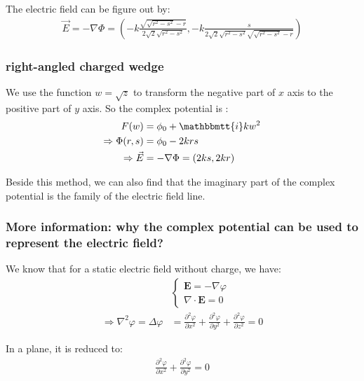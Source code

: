 \documentclass[]{ctexart}
\newcommand{\mi}{\mathbbmtt{i}}
\newcommand{\pa}{\partial}
\begin{document}
				The electric field can be figure out by:
					\begin{equation*}
					\begin{aligned}
						\vec{E}=-\nabla \Phi =\left(-k\frac{\sqrt{\sqrt{r^2-s^2}-r}}{2 \sqrt{2} \sqrt{r^2-s^2}},-k\frac{s}{2 \sqrt{2} \sqrt{r^2-s^2} \sqrt{\sqrt{r^2-s^2}-r}}\right)
					\end{aligned}
					\end{equation*}
			
			\subsubsection{right-angled charged wedge}
				We use the function $w=\sqrt{z}$ to transform the negative part of $x$ axis to the positive part of $y$ axis. So the complex potential is :
					\begin{equation*}
					\begin{aligned}
						F(w)&=\phi_0+\mi k w^2\\
						\Rightarrow \Phi(r,s)&=\phi_0-2krs\\
						\Rightarrow \vec{E}&=-\nabla \Phi =\left(2ks, 2kr\right)
					\end{aligned}
					\end{equation*}
				
				Beside this method, we can also find that the imaginary part of the complex potential is the family of the electric field line. 
				
			\subsubsection{More information: why the complex potential can be used to represent the electric field?}
				We know that for a static electric field without charge, we have:
					\begin{equation*}
					\begin{aligned}
						&\begin{cases}
							\boldsymbol{E}=-\nabla \varphi\\
							\nabla \cdot \boldsymbol{E}=0
						\end{cases}\\
						\Rightarrow \nabla^2\varphi=\Delta \varphi &=\frac{\pa^2 \varphi}{\pa x^2}+\frac{\pa^2 \varphi}{\pa y^2}+\frac{\pa^2 \varphi}{\pa z^2}=0
					\end{aligned}
					\end{equation*}
				
				In a plane, it is reduced to:
					\begin{equation*}
					\begin{aligned}
						\frac{\pa^2 \varphi}{\pa x^2}+\frac{\pa^2 \varphi}{\pa y^2}=0
					\end{aligned}
					\end{equation*}
				
\end{document}
